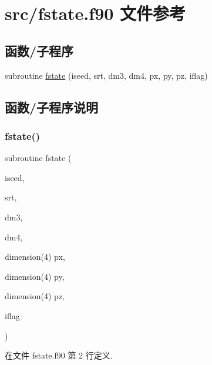 \hypertarget{fstate_8f90}{}\section{src/fstate.f90 文件参考}
\label{fstate_8f90}
\subsection*{函数/子程序}
\begin{DoxyCompactItemize}
\item 
subroutine \mbox{\hyperlink{fstate_8f90_af9ed3aa2f2f60d1e372173f162d6ab72}{fstate}} (iseed, srt, dm3, dm4, px, py, pz, iflag)
\end{DoxyCompactItemize}


\subsection{函数/子程序说明}
\mbox{\label{fstate_8f90_af9ed3aa2f2f60d1e372173f162d6ab72}} 
\subsubsection{\texorpdfstring{fstate()}{fstate()}}
{\footnotesize\ttfamily subroutine fstate (\begin{DoxyParamCaption}\item[{}]{iseed,  }\item[{}]{srt,  }\item[{}]{dm3,  }\item[{}]{dm4,  }\item[{dimension(4)}]{px,  }\item[{dimension(4)}]{py,  }\item[{dimension(4)}]{pz,  }\item[{}]{iflag }\end{DoxyParamCaption})}



在文件 fstate.\+f90 第 2 行定义.

